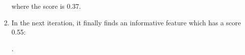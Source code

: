 \begin{enumerate}
\begin{center}
{\begin{tikzpicture}
	\end{tikzpicture}
	}
\end{center}
where the score is 0.37.
\item In the next iteration, it finally finds an informative feature which has a score 0.55:
\begin{center}
.
\end{center}
\end{enumerate}




















